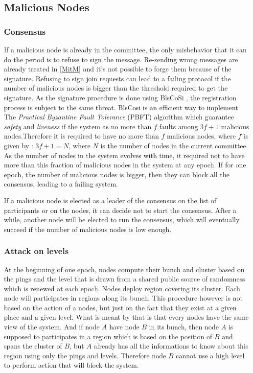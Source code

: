 \documentclass[a4paper,11pt,oneside]{report}
\begin{document}
\subsection{Malicious Nodes}
\subsubsection{Consensus}
If a malicious node is already in the committee, the only misbehavior that it
can do the period is to refuse to sign the message. Re-sending wrong messages
are already treated in \ref{MitM} and it's not possible to forge them because
of the signature. Refusing to sign join requests can lead to a failing protocol
if the number of malicious nodes is bigger than the threshold required to get
the signature. As the signature procedure is done using BlsCoSi \cite{BlsCoSi},
the registration process is subject to the same threat. BlsCosi is an efficient
way to implement The \textit{Practical Byzantine Fault Tolerance} (PBFT)
algorithm which guarantee \textit{safety} and \textit{liveness} if the system
as no more than $f$ faults among $3f+1$ malicious nodes.Therefore it is
required to have no more than $f$ malicious nodes, where $f$ is given by : $3f
+ 1 = N$, where $N$ is the number of nodes in the current committee. As the
number of nodes in the system evolves with time, it required not to have more
than this fraction of malicious nodes in the system at any epoch. If for one
epoch, the number of malicious nodes is bigger, then they can block all the
consensus, leading to a failing system. 

If a malicious node is elected as a leader of the consensus on the list of
participants or on the nodes, it can decide not to start the consensus. After a
while, another node will be elected to run the consensus, which will eventually
succeed if the number of malicious nodes is low enough.

\subsubsection{Attack on levels}
At the beginning of one epoch, nodes compute their bunch and cluster based on
the pings and the level that is drawn from a shared public source of randomness
which is renewed at each epoch. Nodes deploy region covering its cluster. Each
node will participates in regions along its bunch. This procedure however is
not based on the action of a nodes, but just on the fact that they exist at a
given place and a given level. What is meant by that is that every nodes have
the same view of the system. And if node $A$ have node $B$ in its bunch, then
node $A$ is supposed to participates in a region which is based on the position
of $B$ and spans the cluster of $B$, but $A$ already has all the informations
to know about this region using only the pings and levels. Therefore node $B$
cannot use a high level to perform action that will block the system. 
\end{document}
